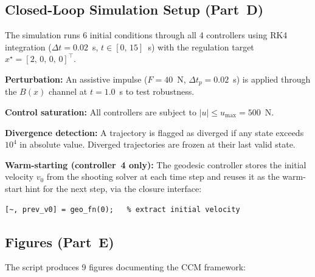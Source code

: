 \documentclass[11pt,a4paper]{article}
\begin{document}
\subsection{Closed-Loop Simulation Setup (Part~D)}

The simulation runs 6 initial conditions through all 4 controllers using RK4 integration (\(\Delta t = 0.02\)~s, \(t \in [0,\,15]\)~s) with the regulation target \(x^\star = [2,\, 0,\, 0,\, 0]^\top\).

\textbf{Perturbation:} An assistive impulse (\(F = 40\)~N, \(\Delta t_p = 0.02\)~s) is applied through the \(B(x)\) channel at \(t = 1.0\)~s to test robustness.

\textbf{Control saturation:} All controllers are subject to \(|u| \le u_{\max} = 500\)~N.

\textbf{Divergence detection:} A trajectory is flagged as diverged if any state exceeds \(10^4\) in absolute value.  Diverged trajectories are frozen at their last valid state.

\textbf{Warm-starting (controller~4 only):} The geodesic controller stores the initial velocity \(v_0\) from the shooting solver at each time step and reuses it as the warm-start hint for the next step, via the closure interface:
\begin{lstlisting}
[~, prev_v0] = geo_fn(0);   % extract initial velocity
\end{lstlisting}

\subsection{Figures (Part~E)}

The script produces 9 figures documenting the CCM framework:
\end{document}
